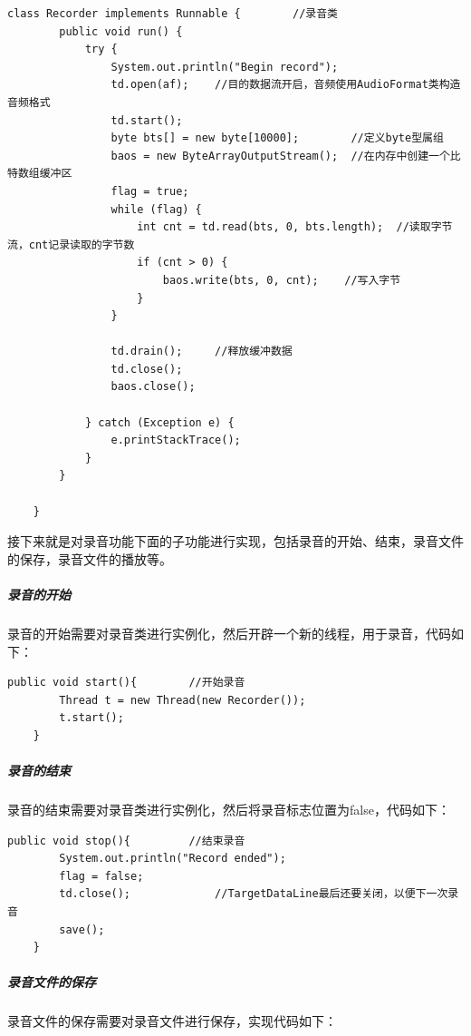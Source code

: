\documentclass[UTF8,12pt]{article}
\begin{document}
\begin{lstlisting}[title=录音类的封装,frame=shadowbox]
    class Recorder implements Runnable {        //录音类
        public void run() {
            try {
                System.out.println("Begin record");
                td.open(af);    //目的数据流开启，音频使用AudioFormat类构造音频格式
                td.start();
                byte bts[] = new byte[10000];        //定义byte型属组
                baos = new ByteArrayOutputStream();  //在内存中创建一个比特数组缓冲区
                flag = true;
                while (flag) {
                    int cnt = td.read(bts, 0, bts.length);  //读取字节流，cnt记录读取的字节数
                    if (cnt > 0) {
                        baos.write(bts, 0, cnt);    //写入字节
                    }
                }

                td.drain();     //释放缓冲数据
                td.close();
                baos.close();

            } catch (Exception e) {
                e.printStackTrace();
            }
        }

    }
\end{lstlisting}

接下来就是对录音功能下面的子功能进行实现，包括录音的开始、结束，录音文件的保存，录音文件的播放等。

\subparagraph{录音的开始}
录音的开始需要对录音类进行实例化，然后开辟一个新的线程，用于录音，代码如下：

\begin{lstlisting}[title=录音的开始,frame=shadowbox]
    public void start(){        //开始录音
        Thread t = new Thread(new Recorder());
        t.start();
    }
\end{lstlisting}

\subparagraph{录音的结束}
录音的结束需要对录音类进行实例化，然后将录音标志位置为false，代码如下：

\begin{lstlisting}[title=录音的结束,frame=shadowbox]
    public void stop(){         //结束录音
        System.out.println("Record ended");
        flag = false;
        td.close();             //TargetDataLine最后还要关闭，以便下一次录音
        save();
    }
\end{lstlisting}

\subparagraph{录音文件的保存}
录音文件的保存需要对录音文件进行保存，实现代码如下：
\end{document}

